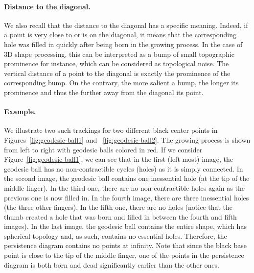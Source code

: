 
\paragraph*{Distance to the diagonal.} We also recall that the distance to the diagonal has a specific meaning. Indeed,
if a point is very close to or is on the diagonal, it means that the corresponding hole was filled in quickly after
being born in the growing process. In the case of 3D shape processing, this can be interpreted as
a bump of small topographic prominence for instance, which can be considered as topological noise. The vertical
distance of a point to the diagonal is exactly the prominence of the corresponding bump.
On the contrary, the more salient a bump, the longer its prominence and thus the further away from the diagonal its point.


\paragraph*{Example.}
We illustrate two such trackings for two different black center points in
Figures~\ref{fig:geodesic-ball1} and ~\ref{fig:geodesic-ball2}.  The growing process is shown from
left to right with geodesic balls colored in red. If we consider Figure~\ref{fig:geodesic-ball1}, we
can see that in the first (left-most) image, the geodesic ball has no non-contractible cycles
(holes) as it is simply connected.  In the second image, the geodesic ball contains one inessential
hole (at the tip of the middle finger). In the third one, there are no non-contractible holes again
as the previous one is now filled in.  In the fourth image, there are three inessential holes (the
three other fingers). In the fifth one, there are no holes (notice that the thumb created a
hole that was born and filled in between the fourth and fifth images).  In the last image, the
geodesic ball contains the entire shape, which has spherical topology and, as such, contains no
essential holes. Therefore, the persistence diagram contains no points at infinity. Note that since
the black base point is close to the tip of the middle finger, one of the points in the
persistence diagram is both born and dead significantly earlier than the other ones.

